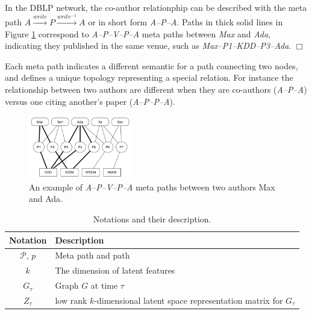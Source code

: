 \begin{example}
In the DBLP network, the co-author relationphip can be described with the meta path $A\xrightarrow{write}P\xrightarrow{write^{-1}}A$ or in short form \textit{A--P--A}. Paths in thick solid lines in Figure \ref{sampleNetwork} correspond to \textit{A--P--V--P--A} meta paths between \textit{Max} and \textit{Ada}, indicating they published in the same venue, such as \textit{Max--P1--KDD--P3--Ada}. $\Box$

\end{example}

Each meta path indicates a different semantic for a path connecting two nodes, and defines a unique topology representing a special relation. For instance the relationship between two authors are different when they are co-authors (\textit{A--P--A}) versus one citing another's paper (\textit{A--P--P--A}).

\begin{figure}[t]
  \centering
      \includegraphics[width=0.4\textwidth]{figs/exampleSocialNetwork.pdf}
  \caption{An example of \textit{A--P--V--P--A} meta paths between two authors Max and Ada.}\label{sampleNetwork}
\end{figure}





\begin{table}[h]
\centering
\caption{Notations and their description.}
\label{table_notations}
\begin{tabular}{|c|l|} \hline
\textbf{Notation} & \textbf{Description} \\ \hline
$\mathcal{P}$, $p$  & Meta path and path \\ \hline
$k$ & The dimension of latent features \\ \hline
$G_\tau$ & Graph $G$ at time $\tau$  \\ \hline
$Z_\tau$ & low rank $k$-dimensional latent space representation matrix for $G_\tau$ \\ \hline

\end{tabular}
\end{table}

